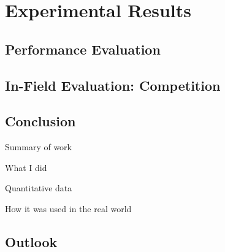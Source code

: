 

\chapter{Experimental Results}

\section{Performance Evaluation}

\section{In-Field Evaluation: Competition}




\section{Conclusion}

Summary of work

What I did

Quantitative data

How it was used in the real world

\section{Outlook}